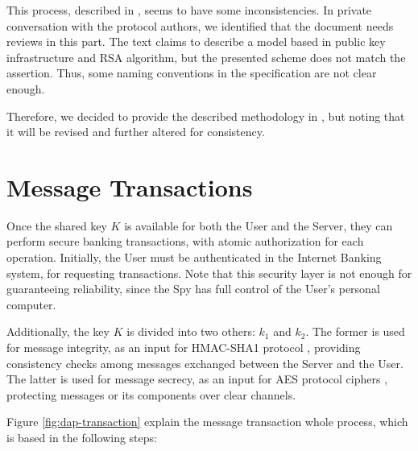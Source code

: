 This process, described in \cite[p.78]{Peotta2012}, seems to have some inconsistencies. In private conversation with the protocol authors, we identified that the document needs reviews in this part. The text claims to describe a model based in public key infrastructure and RSA algorithm, but the presented scheme does not match the assertion. Thus, some naming conventions in the specification are not clear enough.

Therefore, we decided to provide the described methodology in \cite{Peotta2012}, but noting that it will be revised and further altered for consistency.




















\section{Message Transactions}
Once the shared key $K$ is available for both the User and the Server, they can perform secure banking transactions, with atomic authorization for each operation. Initially, the User must be authenticated in the Internet Banking system, for requesting transactions. Note that this security layer is not enough for guaranteeing reliability, since the Spy has full control of the User's personal computer.

Additionally, the key $K$ is divided into two others: $k_1$ and $k_2$. The former is used for message integrity, as an input for HMAC-SHA1 protocol \cite{Bellare96}, providing consistency checks among messages exchanged between the Server and the User. The latter is used for message secrecy, as an input for AES protocol ciphers \cite{AES}, protecting messages or its components over clear channels.

Figure \ref{fig:dap-transaction} explain the message transaction whole process, which is based in the following steps:

